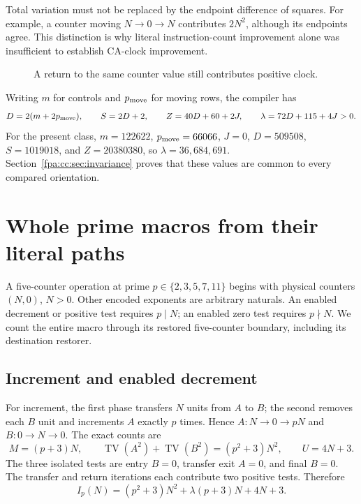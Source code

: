 \documentclass[11pt,a4paper]{article}
\numberwithin{equation}{section}
\newcommand{\TV}{\operatorname{TV}}
\newcommand{\lam}{\lambda}
\begin{document}
Total variation must not be replaced by the endpoint difference of squares.
For example, a counter moving $N\to0\to N$ contributes $2N^2$, although
its endpoints agree. This distinction is why literal instruction-count
improvement alone was insufficient to establish CA-clock improvement.

\begin{figure}[htbp]
\centering
{}
\caption{A return to the same counter value still contributes positive clock.}
\end{figure}

Writing $m$ for controls and $p_{\rm move}$ for moving rows, the compiler has
\[
 D=2(m+2p_{\rm move}),\qquad S=2D+2,\qquad Z=40D+60+2J,
 \qquad \lam=72D+115+4J>0.
\]
For the present class, $m=122622$, $p_{\rm move}=66066$, $J=0$,
$D=509508$, $S=1019018$, and $Z=20380380$, so
$\lam=36{,}684{,}691$. Section~\ref{fpa:cc:sec:invariance} proves that these values
are common to every compared orientation.
\newpage

\section{Whole prime macros from their literal paths}
\label{fpa:cc:sec:macros}
A five-counter operation at prime $p\in\{2,3,5,7,11\}$ begins with physical
counters $(N,0)$, $N>0$. Other encoded exponents are arbitrary naturals.
An enabled decrement or positive test requires $p\mid N$; an enabled zero
test requires $p\nmid N$. We count the entire macro through its restored
five-counter boundary, including its destination restorer.

\subsection{Increment and enabled decrement}
For increment, the first phase transfers $N$ units from $A$ to $B$; the
second removes each $B$ unit and increments $A$ exactly $p$ times. Hence
$A:N\to0\to pN$ and $B:0\to N\to0$. The exact counts are
\[
 M=(p+3)N,\qquad \TV(A^2)+\TV(B^2)=(p^2+3)N^2,\qquad U=4N+3.
\]
The three isolated tests are entry $B=0$, transfer exit $A=0$, and final
$B=0$. The transfer and return iterations each contribute two positive
tests. Therefore
\begin{equation}
 I_p(N)=(p^2+3)N^2+\lam(p+3)N+4N+3.
 \label{fpa:cc:eq:inc}
\end{equation}
\end{document}
